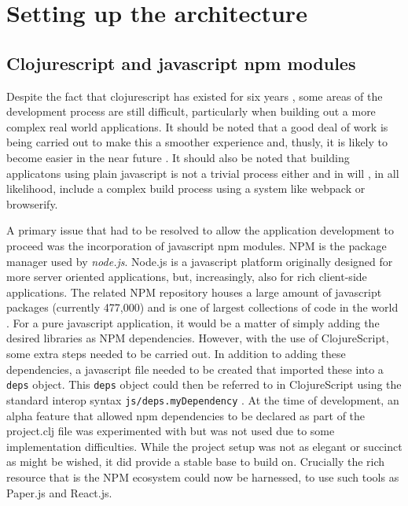 \documentclass[12pt]{report}
\begin{document}
\chapter{Setting up the architecture}
\label{sec:orgb644dd8}
\section{Clojurescript and javascript npm modules}
\label{sec:orgdd0bac0}
Despite the fact that clojurescript has existed for six years
\cite{sierra_clojure_2011}, some areas of the development process are still
difficult, particularly when building out a more complex real world
applications. It should be noted that a good deal of work is being carried out
to make this a smoother experience and, thusly, it is likely to become easier in
the near future \cite{monteiro_clojurescript_2017}. It should also be noted that
building applicatons using plain javascript is not a trivial process either and
in will , in all likelihood, include a complex build process using a system like
webpack or browserify.

A primary issue that had to be resolved to allow the application development to
proceed was the incorporation of javascript npm modules. NPM is the package
manager used by \emph{node.js}. Node.js is a javascript platform originally designed
for more server oriented applications, but, increasingly, also for rich
client-side applications. The related NPM repository houses a large amount of
javascript packages (currently 477,000) and is one of largest collections of
code in the world . For a pure javascript application, it would be a matter of
simply adding the desired libraries as NPM dependencies. However, with the use
of ClojureScript, some extra steps needed to be carried out. In addition to
adding these dependencies, a javascript file needed to be created that imported
these into a \texttt{deps} object. This \texttt{deps} object could then be referred to in
ClojureScript using the standard interop syntax \texttt{js/deps.myDependency}
\cite{weller_clojurescript/reagent_2017}. At the time of development, an alpha
feature that allowed npm dependencies to be declared as part of the project.clj
file was experimented with but was not used due to some implementation
difficulties. While the project setup was not as elegant or succinct as might be
wished, it did provide a stable base to build on. Crucially the rich resource
that is the NPM ecosystem could now be harnessed, to use such tools as Paper.js
and React.js.
\end{document}
